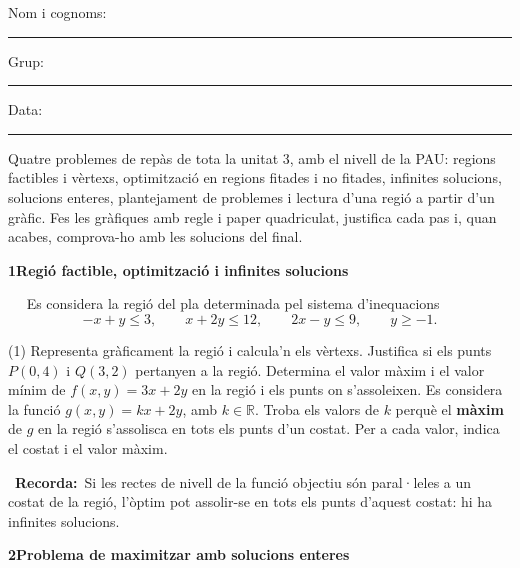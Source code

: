 \documentclass[11pt,a4paper]{article}
\newcounter{exer}
\newcommand{\ex}[1]{\par\needspace{4\baselineskip}\medskip\stepcounter{exer}\noindent{\color{navy}\bfseries\theexer.}\ \ }
\newcommand{\seccio}[2]{\par\needspace{10\baselineskip}\bigskip
  \begin{tcolorbox}[colback=navy,colframe=navy,coltext=white,arc=2mm,boxrule=0pt,left=3mm,right=3mm,top=1.2mm,bottom=1.2mm]
  {\large\bfseries #1\quad #2}
  \end{tcolorbox}\vspace{-2pt}}
\newcommand{\recorda}[1]{\par\smallskip\begin{tcolorbox}[colback=accent!7,colframe=accent!55,arc=2mm,boxrule=0.5pt,left=2.5mm,right=2.5mm,top=1mm,bottom=1mm]\small{\color{accent}\faLightbulb[regular]}\ \textbf{Recorda:}\ #1\end{tcolorbox}}
\begin{document}
\thispagestyle{primera}


\vspace{10pt}
Nom i cognoms: \rule{8.4cm}{0.4pt}\hfill Grup: \rule{1.6cm}{0.4pt}\hfill Data: \rule{2.2cm}{0.4pt}

\vspace{8pt}
\begin{tcolorbox}[colback=soft,colframe=soft,arc=2mm,left=3mm,right=3mm,top=1.5mm,bottom=1.5mm]
\small Quatre problemes de repàs de tota la unitat 3, amb el nivell de la PAU: regions factibles i vèrtexs, optimització en regions fitades i no fitades, infinites solucions, solucions enteres, plantejament de problemes i lectura d'una regió a partir d'un gràfic. Fes les gràfiques amb regle i paper quadriculat, justifica cada pas i, quan acabes, comprova-ho amb les solucions del final.
\end{tcolorbox}

\seccio{1}{Regió factible, optimització i infinites solucions}

\ex{1} Es considera la regió del pla determinada pel sistema d'inequacions\[-x+y\leq 3,\qquad x+2y\leq 12,\qquad 2x-y\leq 9,\qquad y\geq -1.\]\begin{tasks}(1)
  \task Representa gràficament la regió i calcula'n els vèrtexs.
  \task Justifica si els punts $P(0,4)$ i $Q(3,2)$ pertanyen a la regió.
  \task Determina el valor màxim i el valor mínim de $f(x,y)=3x+2y$ en la regió i els punts on s'assoleixen.
  \task Es considera la funció $g(x,y)=kx+2y$, amb $k\in\mathbb{R}$. Troba els valors de $k$ perquè el \textbf{màxim} de $g$ en la regió s'assolisca en tots els punts d'un costat. Per a cada valor, indica el costat i el valor màxim.
\end{tasks}\recorda{Si les rectes de nivell de la funció objectiu són paral·leles a un costat de la regió, l'òptim pot assolir-se en tots els punts d'aquest costat: hi ha infinites solucions.}


\seccio{2}{Problema de maximitzar amb solucions enteres}
\end{document}
